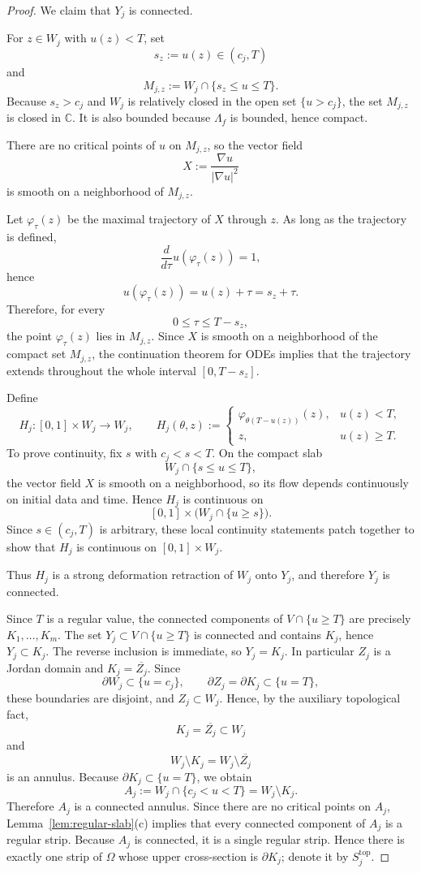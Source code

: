 \documentclass[12pt]{amsart}
\theoremstyle{definition}
\theoremstyle{remark}
\begin{document}
\begin{proof}
We claim that $Y_j$ is connected.

For $z\in W_j$ with $u(z)<T$, set
\[
s_z:=u(z)\in(c_j,T)
\]
and
\[
M_{j,z}:=W_j\cap\{s_z\le u\le T\}.
\]
Because $s_z>c_j$ and $W_j$ is relatively closed in the open set $\{u>c_j\}$, the set
$M_{j,z}$ is closed in $\mathbb C$. It is also bounded because $\Lambda_f$ is bounded,
hence compact.

There are no critical points of $u$ on $M_{j,z}$, so the vector field
\[
X:=\frac{\nabla u}{|\nabla u|^2}
\]
is smooth on a neighborhood of $M_{j,z}$.

Let $\varphi_\tau(z)$ be the maximal trajectory of $X$ through $z$. As long as the
trajectory is defined,
\[
\frac{d}{d\tau}u(\varphi_\tau(z))=1,
\]
hence
\[
u(\varphi_\tau(z))=u(z)+\tau=s_z+\tau.
\]
Therefore, for every
\[
0\le \tau\le T-s_z,
\]
the point $\varphi_\tau(z)$ lies in $M_{j,z}$. Since $X$ is smooth on a neighborhood of the
compact set $M_{j,z}$, the continuation theorem for ODEs implies that the trajectory extends
throughout the whole interval $[0,T-s_z]$.

Define
\[
H_j:[0,1]\times W_j\to W_j,
\qquad
H_j(\theta,z):=
\begin{cases}
\varphi_{\theta(T-u(z))}(z),& u(z)<T,\\[1mm]
z,& u(z)\ge T.
\end{cases}
\]
To prove continuity, fix $s$ with $c_j<s<T$. On the compact slab
\[
W_j\cap\{s\le u\le T\},
\]
the vector field $X$ is smooth on a neighborhood, so its flow depends continuously on
initial data and time. Hence $H_j$ is continuous on
\[
[0,1]\times \bigl(W_j\cap\{u\ge s\}\bigr).
\]
Since $s\in(c_j,T)$ is arbitrary, these local continuity statements patch together to show
that $H_j$ is continuous on $[0,1]\times W_j$.

Thus $H_j$ is a strong deformation retraction of $W_j$ onto $Y_j$, and therefore $Y_j$
is connected.

Since $T$ is a regular value, the connected components of $V\cap\{u\ge T\}$ are precisely $K_1,\dots,K_m$. The set $Y_j\subset V\cap\{u\ge T\}$ is connected and contains $K_j$, hence $Y_j\subset K_j$. The reverse inclusion is immediate, so $Y_j=K_j$. In particular $Z_j$ is a Jordan domain and $K_j=\overline{Z_j}$. Since
\[
\partial W_j\subset \{u=c_j\},
\qquad
\partial Z_j=\partial K_j\subset \{u=T\},
\]
these boundaries are disjoint, and $Z_j\subset W_j$. Hence, by the auxiliary topological fact,
\[
K_j=\overline{Z_j}\subset W_j
\]
and
\[
W_j\setminus K_j=W_j\setminus \overline{Z_j}
\]
is an annulus. Because $\partial K_j\subset \{u=T\}$, we obtain
\[
A_j:=W_j\cap\{c_j<u<T\}=W_j\setminus K_j.
\]
Therefore $A_j$ is a connected annulus. Since there are no critical points on $A_j$, Lemma~\ref{lem:regular-slab}(c) implies that every connected component of $A_j$ is a regular strip. Because $A_j$ is connected, it is a single regular strip. Hence there is exactly one strip of $\Omega$ whose upper cross-section is $\partial K_j$; denote it by $S_j^{\mathrm{top}}$.


\end{proof}
\end{document}
